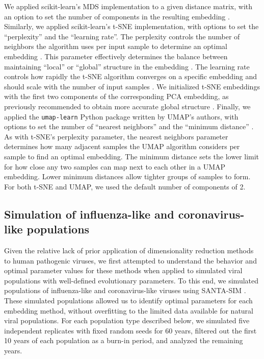 \documentclass[webpdf,contemporary,large,single]{oup-authoring-template}%
\theoremstyle{thmstyleone}%
\theoremstyle{thmstyletwo}%
\theoremstyle{thmstylethree}%
\begin{document}
We applied scikit-learn's MDS implementation to a given distance matrix, with an option to set the number of components in the resulting embedding \citep{Pedregosa2011}.
Similarly, we applied scikit-learn's t-SNE implementation, with options to set the ``perplexity'' and the ``learning rate''.
The perplexity controls the number of neighbors the algorithm uses per input sample to determine an optimal embedding \citep{maaten2008visualizing}.
This parameter effectively determines the balance between maintaining ``local'' or ``global'' structure in the embedding \citep{kobak_2019}.
The learning rate controls how rapidly the t-SNE algorithm converges on a specific embedding \citep{Jacobs1988,maaten2008visualizing} and should scale with the number of input samples \citep{Belkina2019}.
We initialized t-SNE embeddings with the first two components of the corresponding PCA embedding, as previously recommended to obtain more accurate global structure \citep{kobak_2019,kobak_2021}.
Finally, we applied the \texttt{umap-learn} Python package written by UMAP's authors, with options to set the number of ``nearest neighbors'' and the ``minimum distance'' \citep{lel2018umap}.
As with t-SNE's perplexity parameter, the nearest neighbors parameter determines how many adjacent samples the UMAP algorithm considers per sample to find an optimal embedding.
The minimum distance sets the lower limit for how close any two samples can map next to each other in a UMAP embedding.
Lower minimum distances allow tighter groups of samples to form.
For both t-SNE and UMAP, we used the default number of components of 2.

\subsection{Simulation of influenza-like and coronavirus-like populations}

Given the relative lack of prior application of dimensionality reduction methods to human pathogenic viruses, we first attempted to understand the behavior and optimal parameter values for these methods when applied to simulated viral populations with well-defined evolutionary parameters.
To this end, we simulated populations of influenza-like and coronavirus-like viruses using SANTA-SIM \citep{Jariani2019}.
These simulated populations allowed us to identify optimal parameters for each embedding method, without overfitting to the limited data available for natural viral populations.
For each population type described below, we simulated five independent replicates with fixed random seeds for 60 years, filtered out the first 10 years of each population as a burn-in period, and analyzed the remaining years.
\end{document}
